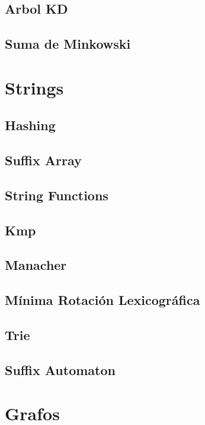 \documentclass[a4paper,11pt,landscape,twocolumn]{article}
\begin{document}
\subsection{Arbol KD}

\subsection{Suma de Minkowski}


\section{Strings} %
\subsection{Hashing}

\subsection{Suffix Array}

\subsection{String Functions}

\subsection{Kmp}

\subsection{Manacher}

\subsection{Mínima Rotación Lexicográfica}

\subsection{Trie}

\subsection{Suffix Automaton}


\section{Grafos} %
\end{document}

